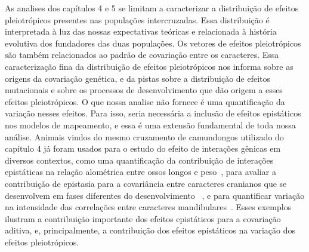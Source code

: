 \begin{refsection}
As analises dos capítulos 4 e 5 se limitam a caracterizar a distribuição de
efeitos pleiotrópicos presentes nas populações intercruzadas. Essa
distribuição é interpretada à luz das nossas expectativas teóricas e
relacionada à história evolutiva dos fundadores das duas populações. Os
vetores de efeitos pleiotrópicos são também relacionados ao padrão de
covariação entre os caracteres. Essa caracterização fina da distribuição de
efeitos pleiotrópicos nos informa sobre as origens da covariação genética, e
da pistas sobre a distribuição de efeitos mutacionais e sobre os processos de
desenvolvimento que dão origem a esses efeitos pleiotrópicos. O que nossa
analise não fornece é uma quantificação da variação nesses efeitos. Para isso,
seria necessária a inclusão de efeitos epistáticos nos modelos de mapeamento,
e essa é uma extensão fundamental de toda nossa análise. Animais vindos do
mesmo cruzamento de camundongos utilizado do capítulo 4 já foram usados para o
estudo do efeito de interações gênicas em diversos contextos, como uma
quantificação da contribuição de interações epistáticas na relação alométrica
entre ossos longos e peso~\parencite{Pavlicev2008-jy}, para avaliar a
contribuição de epistasia para a covariância entre caracteres cranianos que se
desenvolvem em fases diferentes do desenvolvimento ~\parencite{Wolf2005-nr}, e
para quantificar variação na intensidade das correlações entre caracteres
mandibulares~\parencite{Cheverud2004-qr}. Esses exemplos ilustram a
contribuição importante dos efeitos epistáticos para a covariação aditiva, e,
principalmente, a contribuição dos efeitos epistáticos na variação dos efeitos
pleiotrópicos. 


\end{refsection}

